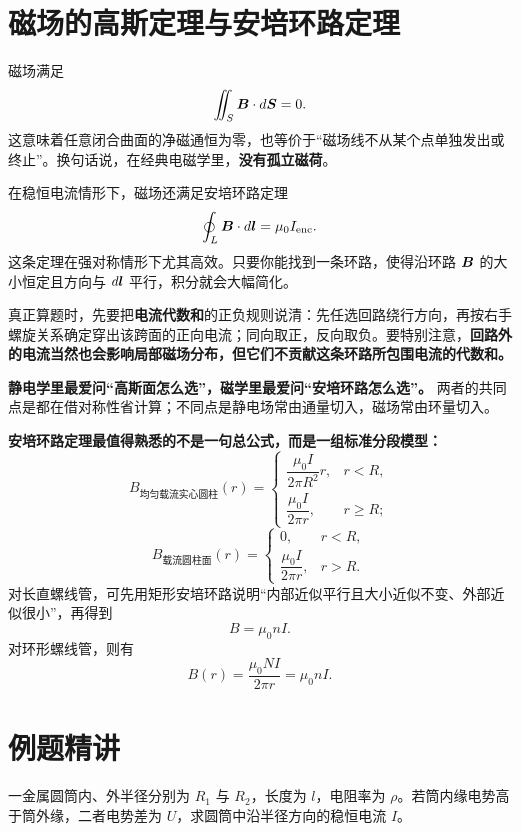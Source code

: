 \documentclass[lang=cn,11pt]{elegantbook}
\begin{document}
\section{磁场的高斯定理与安培环路定理}

磁场满足
\[
\iint_S \vb*{B}\cdot d\vb*{S}=0.
\]
这意味着任意闭合曲面的净磁通恒为零，也等价于“磁场线不从某个点单独发出或终止”。换句话说，在经典电磁学里，\textbf{没有孤立磁荷}。

在稳恒电流情形下，磁场还满足安培环路定理
\[
\oint_L \vb*{B}\cdot d\vb*{l}
=\mu_0 I_{\mathrm{enc}}.
\]
这条定理在强对称情形下尤其高效。只要你能找到一条环路，使得沿环路 \(\vb*{B}\) 的大小恒定且方向与 \(d\vb*{l}\) 平行，积分就会大幅简化。

\begin{remark}
真正算题时，先要把\textbf{电流代数和}的正负规则说清：先任选回路绕行方向，再按右手螺旋关系确定穿出该跨面的正向电流；同向取正，反向取负。要特别注意，\textbf{回路外的电流当然也会影响局部磁场分布，但它们不贡献这条环路所包围电流的代数和。}
\end{remark}

\begin{note}
\textbf{静电学里最爱问“高斯面怎么选”，磁学里最爱问“安培环路怎么选”。} 两者的共同点是都在借对称性省计算；不同点是静电场常由通量切入，磁场常由环量切入。
\end{note}

\begin{remark}
\textbf{安培环路定理最值得熟悉的不是一句总公式，而是一组标准分段模型：}
\[
B_{\text{均匀载流实心圆柱}}(r)=
\begin{cases}
\dfrac{\mu_0 I}{2\pi R^2}r, & r<R,\\[4pt]
\dfrac{\mu_0 I}{2\pi r}, & r\ge R;
\end{cases}
\]
\[
B_{\text{载流圆柱面}}(r)=
\begin{cases}
0, & r<R,\\[4pt]
\dfrac{\mu_0 I}{2\pi r}, & r>R.
\end{cases}
\]
对长直螺线管，可先用矩形安培环路说明“内部近似平行且大小近似不变、外部近似很小”，再得到
\[
B=\mu_0 nI.
\]
对环形螺线管，则有
\[
B(r)=\frac{\mu_0 NI}{2\pi r}=\mu_0 nI.
\]
\end{remark}

\section{例题精讲}

\begin{example}[径向导电圆筒的总电流]
一金属圆筒内、外半径分别为 \(R_1\) 与 \(R_2\)，长度为 \(l\)，电阻率为 \(\rho\)。若筒内缘电势高于筒外缘，二者电势差为 \(U\)，求圆筒中沿半径方向的稳恒电流 \(I\)。
\end{example}
\end{document}
